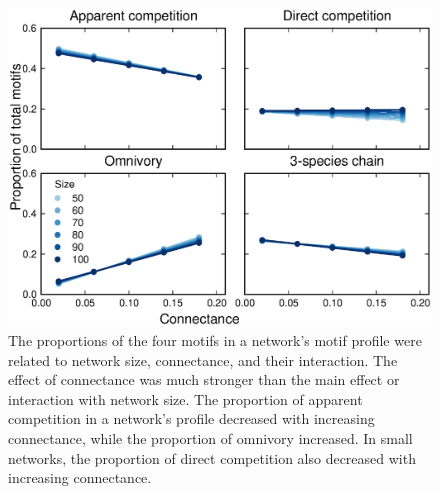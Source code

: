 \documentclass[12pt]{article}
\begin{document}
\begin{spacing}{2.0}
    \begin{figure}[hb!]
        \centering
        \includegraphics[width=\textwidth]{figures/motif_proportion_lms.eps}
        \caption{The proportions of the four motifs in a network's motif profile were related to network size, connectance, and their interaction. The effect of connectance was much stronger than the main effect or interaction with network size. The proportion of apparent competition in a network's profile decreased with increasing connectance, while the proportion of omnivory increased. In small networks, the proportion of direct competition also decreased with increasing connectance.}
        \label{motif_proportion_lms}
    \end{figure}

\clearpage


\end{spacing}
\end{document}
